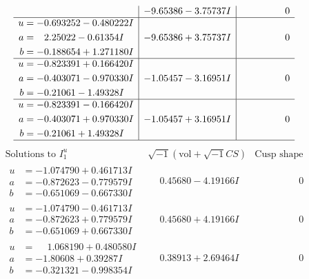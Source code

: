 \documentclass[1p]{elsarticle_modified}
\theoremstyle{definition}
\newcommand{\I}{\sqrt{-1}}
\begin{document}
$$\begin{array}{c|c|c}
 & -9.65386 - 3.75737 I & \phantom{-0.000000 } 0 \\ \hline\begin{aligned}
u &= -0.693252 - 0.480222 I \\
a &= \phantom{-}2.25022 - 0.61354 I \\
b &= -0.188654 + 1.271180 I\end{aligned}
 & -9.65386 + 3.75737 I & \phantom{-0.000000 } 0 \\ \hline\begin{aligned}
u &= -0.823391 + 0.166420 I \\
a &= -0.403071 - 0.970330 I \\
b &= -0.21061 - 1.49328 I\end{aligned}
 & -1.05457 - 3.16951 I & \phantom{-0.000000 } 0 \\ \hline\begin{aligned}
u &= -0.823391 - 0.166420 I \\
a &= -0.403071 + 0.970330 I \\
b &= -0.21061 + 1.49328 I\end{aligned}
 & -1.05457 + 3.16951 I & \phantom{-0.000000 } 0\\
 \hline 
 \end{array}$$\newpage$$\begin{array}{c|c|c}  
\text{Solutions to }I^u_{1}& \I (\text{vol} + \sqrt{-1}CS) & \text{Cusp shape}\\
 \hline 
\begin{aligned}
u &= -1.074790 + 0.461713 I \\
a &= -0.872623 - 0.779579 I \\
b &= -0.651069 - 0.667330 I\end{aligned}
 & \phantom{-}0.45680 - 4.19166 I & \phantom{-0.000000 } 0 \\ \hline\begin{aligned}
u &= -1.074790 - 0.461713 I \\
a &= -0.872623 + 0.779579 I \\
b &= -0.651069 + 0.667330 I\end{aligned}
 & \phantom{-}0.45680 + 4.19166 I & \phantom{-0.000000 } 0 \\ \hline\begin{aligned}
u &= \phantom{-}1.068190 + 0.480580 I \\
a &= -1.80608 + 0.39287 I \\
b &= -0.321321 - 0.998354 I\end{aligned}
 & \phantom{-}0.38913 + 2.69464 I & \phantom{-0.000000 } 0 \\ \hline\begin{aligned}

\end{aligned}
\end{array}$$
\end{document}
